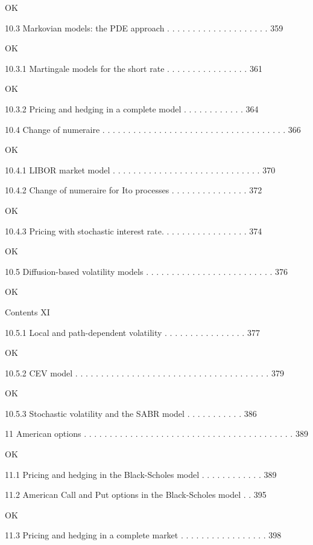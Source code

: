 OK

10.3 Markovian models: the PDE approach . . . . . . . . . . . . . . . . . . . . 359

OK

10.3.1 Martingale models for the short rate . . . . . . . . . . . . . . . . 361

OK

10.3.2 Pricing and hedging in a complete model . . . . . . . . . . . . 364



10.4 Change of numeraire . . . . . . . . . . . . . . . . . . . . . . . . . . . . . . . . . . . . 366

OK

10.4.1 LIBOR market model . . . . . . . . . . . . . . . . . . . . . . . . . . . . . 370



10.4.2 Change of numeraire for Ito processes . . . . . . . . . . . . . . . 372

OK

10.4.3 Pricing with stochastic interest rate. . . . . . . . . . . . . . . . . 374

OK

10.5 Diffusion-based volatility models . . . . . . . . . . . . . . . . . . . . . . . . . 376

OK

Contents XI



10.5.1 Local and path-dependent volatility . . . . . . . . . . . . . . . . 377

OK

10.5.2 CEV model . . . . . . . . . . . . . . . . . . . . . . . . . . . . . . . . . . . . . . 379

OK

10.5.3 Stochastic volatility and the SABR model . . . . . . . . . . . 386



11 American options . . . . . . . . . . . . . . . . . . . . . . . . . . . . . . . . . . . . . . . . . 389

OK

11.1 Pricing and hedging in the Black-Scholes model . . . . . . . . . . . . 389



11.2 American Call and Put options in the Black-Scholes model . . 395

OK

11.3 Pricing and hedging in a complete market . . . . . . . . . . . . . . . . . 398



